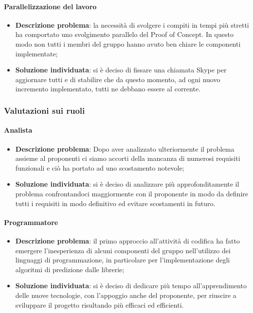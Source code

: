 			\paragraph{Parallelizzazione del lavoro}
				\begin{itemize}
					\item \textbf{Descrizione problema}: la necessità di svolgere i compiti in tempi più stretti ha comportato uno svolgimento parallelo del Proof of Concept\glo. In questo modo non tutti i membri del gruppo hanno avuto ben chiare le componenti implementate;
					\item \textbf{Soluzione individuata}: si è deciso di fissare una chiamata Skype per aggiornare tutti e di stabilire che da questo momento, ad ogni nuovo incremento implementato, tutti ne debbano essere al corrente.
				\end{itemize}
		\subsubsection{Valutazioni sui ruoli}
			\paragraph{Analista}
				\begin{itemize}
					\item \textbf{Descrizione problema}: Dopo aver analizzato ulteriormente il problema assieme al proponenti ci siamo accorti della mancanza di numerosi requisiti funzionali e ciò ha portato ad uno scostamento notevole;
					\item \textbf{Soluzione individuata}: si è deciso di analizzare più approfonditamente il problema confrontandoci maggiormente con il proponente in modo da definire tutti i requisiti in modo definitivo ed evitare scostamenti in futuro.
				\end{itemize}
			\paragraph{Programmatore}
				\begin{itemize}
					\item \textbf{Descrizione problema}: il primo approccio all'attività di codifica ha fatto emergere l'inesperienza di alcuni componenti del gruppo nell'utilizzo dei linguaggi di programmazione, in particolare per l'implementazione degli algoritmi di predizione dalle librerie;
					\item \textbf{Soluzione individuata}: si è deciso di dedicare più tempo all'apprendimento delle nuove tecnologie, con l'appoggio anche del proponente, per riuscire a sviluppare il progetto risultando più efficaci ed efficienti.
				\end{itemize}
